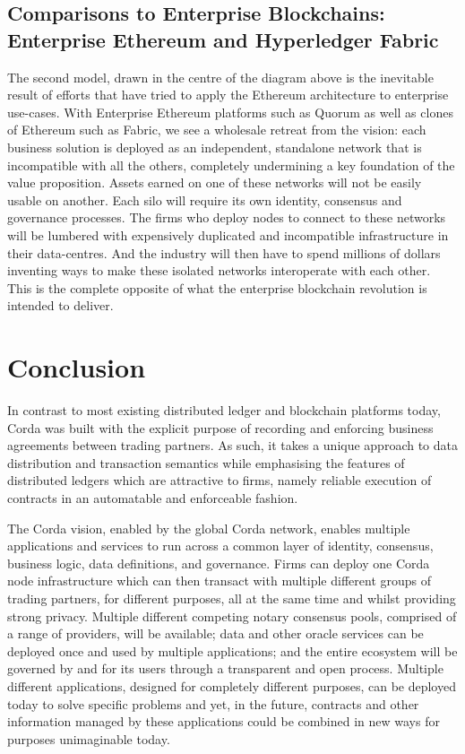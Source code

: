 \documentclass{article}
\begin{document}
\subsection{Comparisons to Enterprise Blockchains: Enterprise Ethereum and Hyperledger Fabric}

The second model, drawn in the centre of the diagram above is the inevitable result of efforts that have tried to apply the Ethereum architecture to enterprise use-cases. With Enterprise Ethereum platforms such as Quorum as well as clones of Ethereum such as Fabric, we see a wholesale retreat from the vision: each business solution is deployed as an independent, standalone network that is incompatible with all the others, completely undermining a key foundation of the value proposition.  Assets earned on one of these networks will not be easily usable on another. Each silo will require its own identity, consensus and governance processes.  The firms who deploy nodes to connect to these networks will be lumbered with expensively duplicated and incompatible infrastructure in their data-centres. And the industry will then have to spend millions of dollars inventing ways to make these isolated networks interoperate with each other. This is the complete opposite of what the enterprise blockchain revolution is intended to deliver.

\section{Conclusion}

In contrast to most existing distributed ledger and blockchain platforms today, Corda was built with the explicit purpose of recording and enforcing business agreements between trading partners. As such, it takes a unique approach to data distribution and transaction semantics while emphasising the features of distributed ledgers which are attractive to firms, namely reliable execution of contracts in an automatable and enforceable fashion.

The Corda vision, enabled by the global Corda network, enables multiple applications and services to run across a common layer of identity, consensus, business logic, data definitions, and governance. Firms can deploy one Corda node infrastructure which can then transact with multiple different groups of trading partners, for different purposes, all at the same time and whilst providing strong privacy. Multiple different competing notary consensus pools, comprised of a range of providers, will be available; data and other oracle services can be deployed once and used by multiple applications; and the entire ecosystem will be governed by and for its users through a transparent and open process.  Multiple different applications, designed for completely different purposes, can be deployed today to solve specific problems and yet, in the future, contracts and other information managed by these applications could be combined in new ways for purposes unimaginable today.





\end{document}
